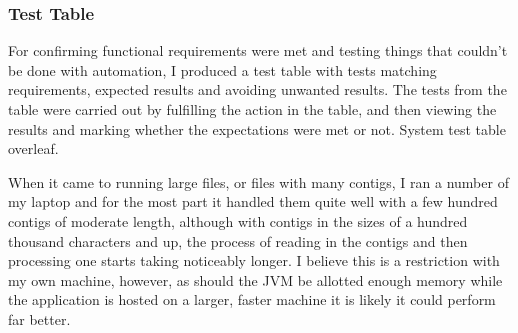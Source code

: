 \subsubsection{Test Table}
For confirming functional requirements were met and testing things that couldn't be done with automation, I produced a test table with tests matching requirements, expected results and avoiding unwanted results. The tests from the table were carried out by fulfilling the action in the table, and then viewing the results and marking whether the expectations were met or not.
\newline
System test table overleaf.



When it came to running large files, or files with many contigs, I ran a number of my laptop and for the most part it handled them quite well with a few hundred contigs of moderate length, although with contigs in the sizes of a hundred thousand characters and up, the process of reading in the contigs and then processing one starts taking noticeably longer. I believe this is a restriction with my own machine, however, as should the JVM be allotted enough memory while the application is hosted on a larger, faster machine it is likely it could perform far better.
